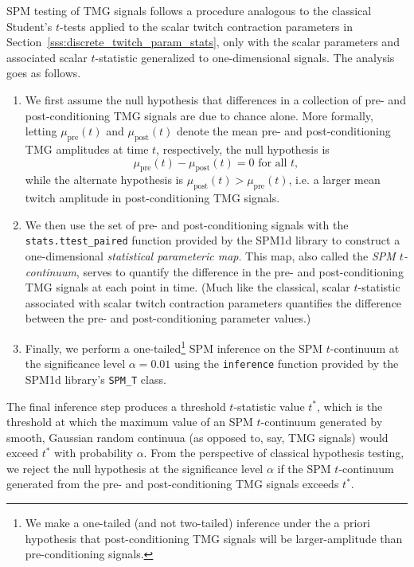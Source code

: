 \documentclass[utf8]{style/FrontiersinHarvard}
\begin{document}
SPM testing of TMG signals follows a procedure analogous to the classical Student's $ t $-tests applied to the scalar twitch contraction parameters in Section~\ref{sss:discrete_twitch_param_stats}, only with the scalar parameters and associated scalar $ t $-statistic generalized to one-dimensional signals.
The analysis goes as follows.
\begin{enumerate}

    \item We first assume the null hypothesis that differences in a collection of pre- and post-conditioning TMG signals are due to chance alone.
    More formally, letting $ \mu_{\mathrm{pre}}(t) $ and $ \mu_{\mathrm{post}}(t) $ denote the mean pre- and post-conditioning TMG amplitudes at time $ t $, respectively, the null hypothesis is
    \begin{equation*}
        \mu_{\text{pre}}(t) - \mu_{\text{post}} (t) = 0 \text{ for all } t,
    \end{equation*}
    while the alternate hypothesis is $ \mu_{\text{post}}(t) > \mu_{\text{pre}}(t) $, i.e. a larger mean twitch amplitude in post-conditioning TMG signals.

    \item We then use the set of pre- and post-conditioning signals with the \texttt{stats.ttest\_paired} function provided by the SPM1d library to construct a one-dimensional \textit{statistical parameteric map}.
    This map, also called the \textit{SPM $ t $-continuum}, serves to quantify the difference in the pre- and post-conditioning TMG signals at each point in time.
    (Much like the classical, scalar $ t $-statistic associated with scalar twitch contraction parameters quantifies the difference between the pre- and post-conditioning parameter values.)

    \item Finally, we perform a one-tailed\footnote{We make a one-tailed (and not two-tailed) inference under the a priori hypothesis that post-conditioning TMG signals will be larger-amplitude than pre-conditioning signals.} SPM inference on the SPM $ t $-continuum at the significance level $ \alpha = 0.01 $ using the \texttt{inference} function provided by the SPM1d library's \texttt{SPM\_T} class.
 
\end{enumerate}
The final inference step produces a threshold $ t $-statistic value $ t^{*} $, which is the threshold at which the maximum value of an SPM $ t $-continuum generated by smooth, Gaussian random continuua (as opposed to, say, TMG signals) would exceed $ t^{*} $ with probability $ \alpha $.
From the perspective of classical hypothesis testing, we reject the null hypothesis at the significance level $ \alpha $ if the SPM $ t $-continuum generated from the pre- and post-conditioning TMG signals exceeds $ t^{*} $.
\end{document}
